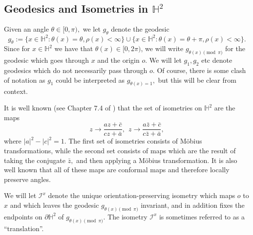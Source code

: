 \documentclass[10pt,a4paper]{amsart}
\newcommand{\BH}{{\mathbb{H}}}
\newcommand{\CI}{{\mathcal{I}}}
\begin{document}
\subsection{Geodesics and Isometries in $\BH^2$}
Given an angle $\theta\in [0,\pi),$ we let $g_\theta$ denote the geodesic 
\begin{equation} \label{eqn:defgeodesic}
  g_\theta:=\{x\in \BH^2: \theta(x)=\theta, \rho(x)<\infty\}
\cup
\{x\in \BH^2: \theta(x)=\theta+\pi, \rho(x)<\infty\}.  
\end{equation}
Since for $x\in \BH^2$ we have that $\theta(x)\in[0,2\pi)$, we will write
$g_{\theta(x) \pmod \pi}$ 
for the geodesic which goes through $x$ and the origin $o.$ We will let $g_1,g_2$ etc denote 
geodesics which do not necessarily pass through $o.$ Of course, there is some clash of notation 
as $g_1$ could be interpreted as $g_{\theta(x)=1},$ but this will be clear from context.

It is well known (see Chapter 7.4 of \cite{B_93}) that the set of isometries on $\BH^2$ are the maps
\[
z \to \frac{az+\bar{c}}{cz+\bar{a}}, \ \ z \to \frac{a\bar{z}+\bar{c}}{c\bar{z}+\bar{a}},
\]
where $|a|^2-|c|^2=1.$ The first set of isometries consists of Möbius transformations,  while the second
set consists of maps which are the result of taking the conjugate $\bar{z},$ and then applying a 
Möbius transformation.
It is also well known that all of these maps are conformal maps and therefore locally 
preserve angles. 


We will let $\CI^x$ denote the unique orientation-preserving 
isometry which maps $o$ to $x$ and which leaves 
the geodesic $g_{\theta(x) \pmod \pi}$ invariant, and in addition 
fixes the endpoints on $\partial \BH^2$
of $g_{\theta(x) \pmod \pi}.$ The isometry $\CI^x$  is 
sometimes referred to as a ``translation''. 
\end{document}
